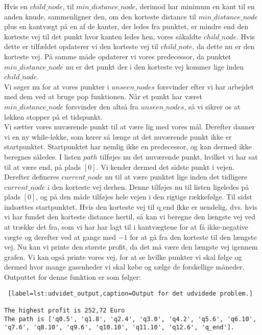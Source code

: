 Hvis en $child\_node$, til  $min\_distance\_node$, derimod har minimum en kant til en anden knude, sammenligner den, om den korteste distance til $min\_distance\_node$ plus en kantvægt på en af de kanter, der ledes fra punktet, er mindre end den korteste vej til det punkt hvor kanten ledes hen, vores såkaldte $child\_node$. Hvis dette er tilfældet opdaterer vi den korteste vej til $child\_note$, da dette nu er den korteste vej. På samme måde opdaterer vi vores predecessor, da punktet $min\_distance\_node$ nu er det punkt der i den korteste vej kommer lige inden $child\_node$.\\
Vi søger nu for at vores punkter i $unseen\_nodes$ forsvinder efter vi har arbejdet med dem ved at bruge pop funktionen. Når et punkt har været $min\_distance\_node$ forsvinder den altså fra $unseen\_nodes$, så vi sikrer os at løkken stopper på et tidspunkt. \\
Vi sætter vores nuværende punkt til at være lig med vores mål.
Derefter danner vi en ny while-løkke, som kører så længe at det nuværende punkt ikke er startpunktet. Startpunktet har nemlig ikke en predecessor, og kan dermed ikke beregnes således. I listen $path$ tilføjes nu det nuværende punkt, hvilket vi har sat til at være $\textrm{end}$, på plads $[0]$. Vi kender dermed det sidste punkt i vejen. Derefter defineres $current\_node$ nu til at være punktet lige inden det tidligere $current\_node$ i den korteste vej derhen. Denne tilføjes nu til listen ligeledes på plads $[0]$, og på den måde tilføjes hele vejen i den rigtige rækkefølge. Til sidst indsættes startpunktet.
Hvis den korteste vej til $\textrm{q\_end}$ ikke er uendelig, dvs. hvis vi har fundet den korteste distance hertil, så kan vi beregne den længste vej ved at trække det fra, som vi har har lagt til i kantvægtene for at få ikke-negative vægte og derefter ved at gange med $-1$ for at gå fra den korteste til den længste vej. 
Nu kan vi printe den største profit, da det må være den længste vej igennem grafen. Vi kan også printe vores vej, for at se hvilke punkter vi skal følge og dermed hvor mange gasenheder vi skal købe og sælge de forskellige måneder.
Outputtet for denne funktion er som følger:
\begin{lstlisting} [label=lst:udvidet_output,caption=Output for det udvidede problem.]

The highest profit is 252,72 Euro
The path is ['q0.5', 'q1.8', 'q2.4', 'q3.0', 'q4.2', 'q5.6', 'q6.10', 'q7.6', 'q8.10', 'q9.6', 'q10.10', 'q11.10', 'q12.6', 'q_end'].

\end{lstlisting}
